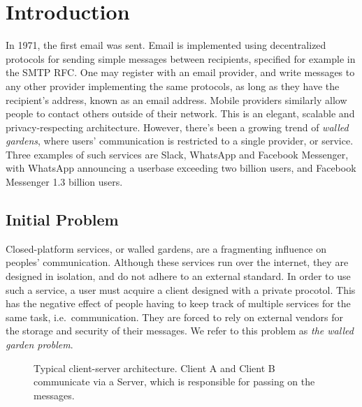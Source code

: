 \chapter{Introduction}
In 1971, the first email was sent\cite{tomlinson2009first}.
Email is implemented using decentralized protocols for sending simple messages between recipients, specified for example in the \ac{SMTP} \ac{RFC}\cite{RFC5321}.
One may register with an email provider, and write messages to any other provider implementing the same protocols, as long as they have the recipient's address, known as an email address.
Mobile providers similarly allow people to contact others outside of their network.
This is an elegant, scalable and privacy-respecting architecture.
However, there's been a growing trend of \textit{walled gardens}\cite{walled_gardens_gunnar_wolf_acm_2018}, where users' communication is restricted to a single provider, or service.
Three examples of such services are Slack, WhatsApp and Facebook Messenger, with WhatsApp announcing a userbase exceeding two billion users, and Facebook Messenger 1.3 billion users\cite{walled_gardens_gunnar_wolf_acm_2018,whatsapp_2b_users_archive_org,messenger_1pt3b_users}.

\section{Initial Problem}\label{subsec:initial_problem_statement}
Closed-platform services, or walled gardens, are a fragmenting influence on peoples' communication.
Although these services run over the internet, they are designed in isolation, and do not adhere to an external standard.
In order to use such a service, a user must acquire a client designed with a private procotol.
This has the negative effect of people having to keep track of multiple services for the same task, i.e.~communication.
They are forced to rely on external vendors for the storage and security of their messages.
We refer to this problem as \textit{the walled garden problem}.

\begin{figure}
    \centering
    \resizebox{0.6\linewidth}{!}{}
    \caption{
        Typical client-server architecture.
        Client A and Client B communicate via a Server, which is responsible for passing on the messages.
    }
    \label{fig:client_server}
\end{figure}

